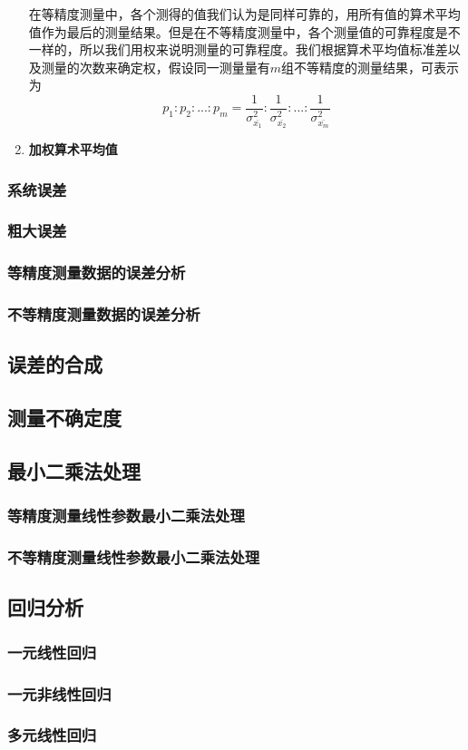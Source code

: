 \begin{enumerate}
	在等精度测量中，各个测得的值我们认为是同样可靠的，用所有值的算术平均值作为最后的测量结果。但是在不等精度测量中，各个测量值的可靠程度是不一样的，所以我们用权来说明测量的可靠程度。我们根据算术平均值标准差以及测量的次数来确定权，假设同一测量量有$ m $组不等精度的测量结果，可表示为\[ p_1:p_2:...:p_m=\frac{1}{\sigma_{\bar{x_1}}^2}:\frac{1}{\sigma_{\bar{x_2}}^2}:...:\frac{1}{\sigma_{\bar{x_m}}^2} \]
	\item \textbf{加权算术平均值}
	
	
\end{enumerate}
\subsubsection{系统误差}
\subsubsection{粗大误差}
\subsubsection{等精度测量数据的误差分析}
\subsubsection{不等精度测量数据的误差分析}
\subsection{误差的合成}
\subsection{测量不确定度}
\subsection{最小二乘法处理}
\subsubsection{等精度测量线性参数最小二乘法处理}
\subsubsection{不等精度测量线性参数最小二乘法处理}
\subsection{回归分析}
\subsubsection{一元线性回归}
\subsubsection{一元非线性回归}
\subsubsection{多元线性回归}